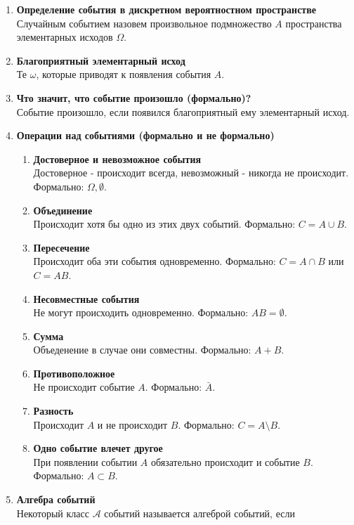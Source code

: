 \documentclass[A4]{article}
\begin{document}
\begin{enumerate}
	\item \textbf{Определение события в дискретном вероятностном пространстве}\\
	Случайным событием назовем произвольное подмножество $A$ пространства элементарных исходов $\Omega$. 
	\item \textbf{Благоприятный элементарный исход}\\
	Те $\omega$, которые приводят к появления события $A$.
	\item \textbf{Что значит, что событие произошло (формально)?}\\
	Событие произошло, если появился благоприятный ему элементарный исход.
	\item \textbf{Операции над событиями (формально и не формально)}
	\begin{enumerate}
		\item \textbf{Достоверное и невозможное события}\\
		Достоверное - происходит всегда, невозможный - никогда не происходит. Формально: $\Omega,\emptyset$.
		\item \textbf{Объединение}\\
		Происходит хотя бы одно из этих двух событий. Формально: $C=A\cup B$.
		\item \textbf{Пересечение}\\
		Происходит оба эти события одновременно. Формально: $C=A\cap B$ или $C=AB$.
		\item \textbf{Несовместные события}\\
		Не могут происходить одновременно. Формально: $AB=\emptyset$.
		\item \textbf{Сумма}\\
		Объеденение в случае они совместны. Формально: $A+B$.
		\item \textbf{Противоположное}\\
		Не происходит событие $A$. Формально: $\bar{A}$.
		\item \textbf{Разность}\\
		Происходит $A$ и не происходит $B$. Формально: $C=A\setminus B$.
		\item \textbf{Одно событие влечет другое}\\
		При появлении событии $A$ обязательно происходит и событие $B$. Формально: $A\subset B$.
	\end{enumerate}
	\item \textbf{Алгебра событий}\\
	Некоторый класс $\mathcal{A}$ событий называется алгеброй событий, если
	\begin{enumerate}

\end{enumerate}
\end{enumerate}
\end{document}
